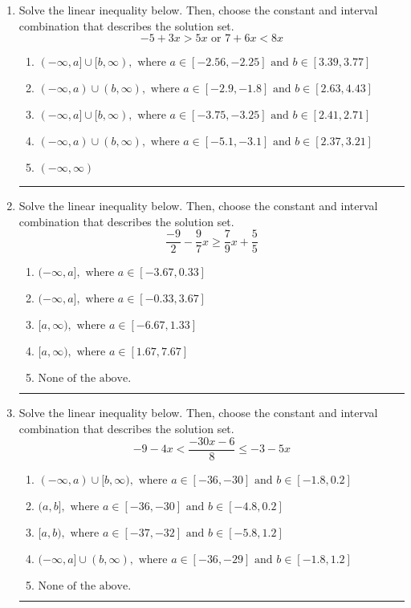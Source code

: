 \documentclass[14pt]{extbook}
\newcommand{\litem}[1]{\item#1\hspace*{-1cm}\rule{\textwidth}{0.4pt}}
\begin{document}
\begin{enumerate}
\litem{
Solve the linear inequality below. Then, choose the constant and interval combination that describes the solution set.\[ -5 + 3 x > 5 x \text{ or } 7 + 6 x < 8 x \]\begin{enumerate}[label=\Alph*.]
\item \( (-\infty, a] \cup [b, \infty), \text{ where } a \in [-2.56, -2.25] \text{ and } b \in [3.39, 3.77] \)
\item \( (-\infty, a) \cup (b, \infty), \text{ where } a \in [-2.9, -1.8] \text{ and } b \in [2.63, 4.43] \)
\item \( (-\infty, a] \cup [b, \infty), \text{ where } a \in [-3.75, -3.25] \text{ and } b \in [2.41, 2.71] \)
\item \( (-\infty, a) \cup (b, \infty), \text{ where } a \in [-5.1, -3.1] \text{ and } b \in [2.37, 3.21] \)
\item \( (-\infty, \infty) \)

\end{enumerate} }
\litem{
Solve the linear inequality below. Then, choose the constant and interval combination that describes the solution set.\[ \frac{-9}{2} - \frac{9}{7} x \geq \frac{7}{9} x + \frac{5}{5} \]\begin{enumerate}[label=\Alph*.]
\item \( (-\infty, a], \text{ where } a \in [-3.67, 0.33] \)
\item \( (-\infty, a], \text{ where } a \in [-0.33, 3.67] \)
\item \( [a, \infty), \text{ where } a \in [-6.67, 1.33] \)
\item \( [a, \infty), \text{ where } a \in [1.67, 7.67] \)
\item \( \text{None of the above}. \)

\end{enumerate} }
\litem{
Solve the linear inequality below. Then, choose the constant and interval combination that describes the solution set.\[ -9 - 4 x < \frac{-30 x - 6}{8} \leq -3 - 5 x \]\begin{enumerate}[label=\Alph*.]
\item \( (-\infty, a) \cup [b, \infty), \text{ where } a \in [-36, -30] \text{ and } b \in [-1.8, 0.2] \)
\item \( (a, b], \text{ where } a \in [-36, -30] \text{ and } b \in [-4.8, 0.2] \)
\item \( [a, b), \text{ where } a \in [-37, -32] \text{ and } b \in [-5.8, 1.2] \)
\item \( (-\infty, a] \cup (b, \infty), \text{ where } a \in [-36, -29] \text{ and } b \in [-1.8, 1.2] \)
\item \( \text{None of the above.} \)


\end{enumerate}}
\end{enumerate}
\end{document}
